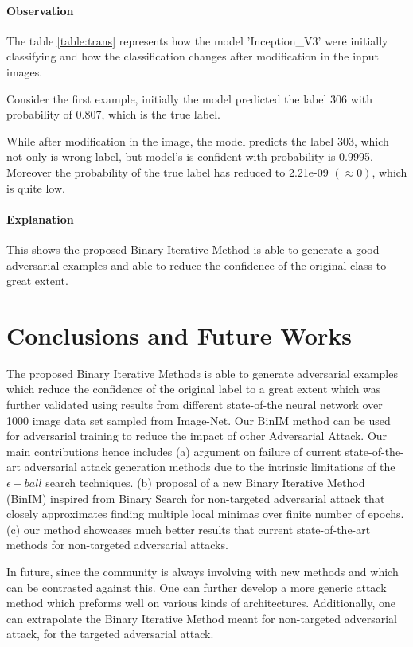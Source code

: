 \documentclass[letterpaper]{article}
\begin{document}
\paragraph{Observation}

The table \ref{table:trans} represents how the model 'Inception\_V3' were initially classifying and how the classification changes after modification in the input images.

Consider the first example, initially the model predicted the label 306 with probability of 0.807, which is the true label.

While after modification in the image, the model predicts the label 303, which not only is wrong label, but model's is confident with probability is 0.9995.
Moreover the probability of the true label has reduced to 2.21e-09 $(\approx 0)$, which is quite low.

\paragraph{Explanation} This shows the proposed Binary Iterative Method is able to generate a good adversarial examples and able to reduce the confidence of the original class to great extent.


\section{Conclusions and Future Works}

The proposed Binary Iterative Methods is able to generate adversarial examples which reduce the confidence of the original label to a great extent which was further validated using results from different state-of-the neural network over 1000 image data set sampled from Image-Net. Our BinIM method can be used for adversarial training to reduce the impact of other Adversarial Attack. Our main contributions hence includes (a) argument on failure of current state-of-the-art adversarial attack generation methods due to the intrinsic limitations of the $ \epsilon -ball $ search techniques. (b) proposal of a new Binary Iterative Method (BinIM) inspired from Binary Search for non-targeted adversarial attack that closely approximates finding multiple local minimas over finite number of epochs. (c) our method showcases much better results that current state-of-the-art methods for non-targeted adversarial attacks.

In future, since the community is always involving with new methods and which can be contrasted against this. One can further develop a more generic attack method which preforms well on various kinds of architectures. Additionally, one can extrapolate the Binary Iterative Method meant for non-targeted adversarial attack, for the targeted adversarial attack.
\end{document}

